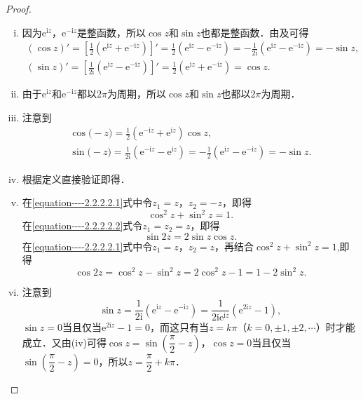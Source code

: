 \documentclass[../../main.tex]{subfiles}
\begin{document}
\begin{proof}
\begin{enumerate}[(i)]
\item 因为$\text{e}^{\text{i}z}$，$\text{e}^{-\text{i}z}$是整函数，所以$\cos z$和$\sin z$也都是整函数．由及可得
\begin{gather*}
(\cos z)' =\left[ \frac{1}{2}\left( \mathrm{e}^{\mathrm{i}z}+\mathrm{e}^{-\mathrm{i}z} \right) \right] ' =\frac{\mathrm{i}}{2}\left( \mathrm{e}^{\mathrm{i}z}-\mathrm{e}^{-\mathrm{i}z} \right) =-\frac{1}{2\mathrm{i}}\left( \mathrm{e}^{\mathrm{i}z}-\mathrm{e}^{-\mathrm{i}z} \right) =-\sin z,
\\
(\sin z)' =\left[ \frac{1}{2\mathrm{i}}\left( \mathrm{e}^{\mathrm{i}z}-\mathrm{e}^{-\mathrm{i}z} \right) \right]'=\frac{1}{2}\left( \mathrm{e}^{\mathrm{i}z}+\mathrm{e}^{-\mathrm{i}z} \right) =\cos z.
\end{gather*}

\item 由于$\text{e}^{\text{i}z}$和$\text{e}^{-\text{i}z}$都以$2\pi$为周期，所以$\cos z$和$\sin z$也都以$2\pi$为周期．

\item 注意到
\begin{gather*}
\cos\mathrm{(}-z)=\frac{1}{2}\left( \mathrm{e}^{-\mathrm{i}z}+\mathrm{e}^{\mathrm{i}z} \right) \cos z,
\\
\sin\mathrm{(}-z)=\frac{1}{2\mathrm{i}}\left( \mathrm{e}^{-\mathrm{i}z}-\mathrm{e}^{\mathrm{i}z} \right) =-\frac{1}{2}\left( \mathrm{e}^{\mathrm{i}z}-\mathrm{e}^{-\mathrm{i}z} \right) =-\sin z.
\end{gather*}

\item 根据定义直接验证即得．

\item 在\eqref{equation----2.2.2.2.1}式中令$z_1 = z$，$z_2 = -z$，即得
\[
\cos^2 z + \sin^2 z = 1.
\]
在\eqref{equation----2.2.2.2.2}式令$z_1 = z_2 = z$，即得
\[
\sin 2z = 2\sin z \cos z.
\]
在\eqref{equation----2.2.2.2.1}式中令$z_1 = z$，$z_2 = z$，再结合$\cos^2 z + \sin^2 z = 1$,即得
\[
\cos 2z=\cos ^2z-\sin ^2z=2\cos ^2z-1=1-2\sin ^2z.
\]

\item 注意到
\[
\sin z = \dfrac{1}{2\text{i}}(\text{e}^{\text{i}z} - \text{e}^{-\text{i}z})
= \dfrac{1}{2\text{i}\text{e}^{\text{i}z}}(\text{e}^{2\text{i}z} - 1),
\]
$\sin z = 0$当且仅当$\text{e}^{2\text{i}z} - 1 = 0$，而这只有当$z = k\pi$（$k = 0, \pm 1, \pm 2, \cdots$）时才能成立．又由(iv)可得$\cos z = \sin\left( \dfrac{\pi}{2} - z \right)$，$\cos z = 0$当且仅当$\sin\left( \dfrac{\pi}{2} - z \right) = 0$，所以$z = \dfrac{\pi}{2} + k\pi$．


\end{enumerate}
\end{proof}
\end{document}
